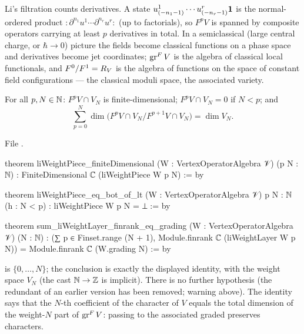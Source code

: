 \begin{physics}
Li's filtration counts derivatives. A state $u^1_{(-n_1-1)}\cdots u^r_{(-n_r-1)}\mathbf{1}$ is the
normal-ordered product ${:}\partial^{n_1}u^1\cdots\partial^{n_r}u^r{:}$ (up to factorials), so $F^pV$ is
spanned by composite operators carrying at least $p$ derivatives in total. In a semiclassical (large
central charge, or $\hbar\to0$) picture the fields become classical functions on a phase space and
derivatives become jet coordinates; $\operatorname{gr}^FV$ is the algebra of classical local functionals, and
$F^0/F^1 = R_V$ is the algebra of functions on the space of constant field configurations --- the
classical moduli space, the associated variety.
\end{physics}

\begin{theorem}\label{l11:thm:litele}
For all $p,N\in{\mathbb{N}}$: $F^pV\cap V_N$ is finite-dimensional; $F^pV\cap V_N = 0$ if $N<p$; and
\begin{equation*}
\sum_{p=0}^{N}\dim\bigl(F^pV\cap V_N\big/F^{p+1}V\cap V_N\bigr) = \dim V_N .
\end{equation*}
\end{theorem}
\noindent File .
\begin{leancode}
theorem liWeightPiece_finiteDimensional (W : VertexOperatorAlgebra 𝒱) (p N : ℕ) :
    FiniteDimensional ℂ (liWeightPiece W p N) := by

theorem liWeightPiece_eq_bot_of_lt (W : VertexOperatorAlgebra 𝒱) {p N : ℕ} (h : N < p) :
    liWeightPiece W p N = ⊥ := by

theorem sum_liWeightLayer_finrank_eq_grading (W : VertexOperatorAlgebra 𝒱) (N : ℕ) :
    (∑ p ∈ Finset.range (N + 1), Module.finrank ℂ (liWeightLayer W p N)) =
      Module.finrank ℂ (W.grading N) := by
\end{leancode}

\begin{dictionary}
 is $\{0,\dots,N\}$; the conclusion is exactly the displayed identity, with
 the weight space $V_N$ (the cast ${\mathbb{N}}\to{\mathbb{Z}}$ is implicit). There is no further hypothesis (the
redundant  of an earlier version has been removed; warning above). The identity says that the $N$-th coefficient of the character of $V$ equals
the total dimension of the weight-$N$ part of $\operatorname{gr}^FV$: passing to the associated graded preserves
characters.
\end{dictionary}

